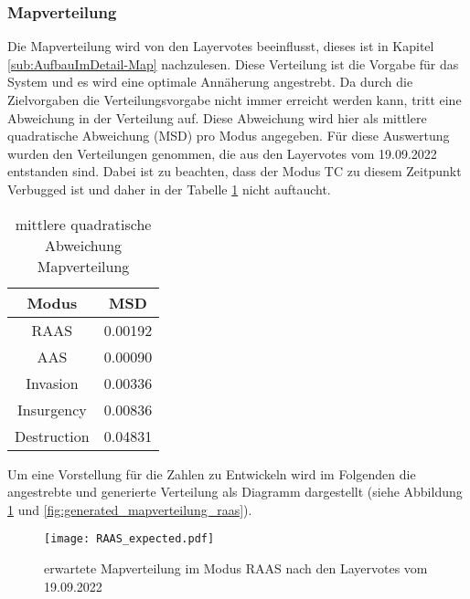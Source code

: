         \subsubsection{Mapverteilung}
            Die Mapverteilung wird von den Layervotes beeinflusst, dieses ist in Kapitel \ref{sub:AufbauImDetail-Map} nachzulesen.
            Diese Verteilung ist die Vorgabe für das System und es wird eine optimale Annäherung angestrebt. Da durch die 
            Zielvorgaben die Verteilungsvorgabe nicht immer erreicht werden kann, tritt eine Abweichung in der Verteilung auf.
            Diese Abweichung wird hier als mittlere quadratische Abweichung (MSD) pro Modus angegeben.
            Für diese Auswertung wurden den Verteilungen genommen, die aus den Layervotes vom 19.09.2022 entstanden sind.
            Dabei ist zu beachten, dass der Modus TC zu diesem Zeitpunkt \glqq{}Verbugged\grqq{} ist und daher 
            in der Tabelle \ref{t:Ergebnisse:fehler_Mapverteilung} nicht auftaucht.\\
            \begin{table}[h]
                \centering
                \begin{tabular}{|| c c ||}
                    \hline
                    Modus & MSD \\
                    \hline
                    \hline
                    RAAS & 0.00192 \\
                    \hline
                    AAS & 0.00090 \\
                    \hline
                    Invasion & 0.00336 \\
                    \hline
                    Insurgency & 0.00836 \\
                    \hline
                    Destruction & 0.04831 \\
                    \hline
                \end{tabular}
                \caption{mittlere quadratische Abweichung Mapverteilung}
                \label{t:Ergebnisse:fehler_Mapverteilung}
            \end{table}
            
            Um eine Vorstellung für die Zahlen zu Entwickeln wird im Folgenden die angestrebte und generierte Verteilung als 
            Diagramm dargestellt (siehe Abbildung \ref{fig:expected_mapverteilung_raas} 
            und \ref{fig:generated_mapverteilung_raas}).

            \begin{figure}[htbp]
                \centering
                \texttt{[image: RAAS\_expected.pdf]}
                \caption{erwartete Mapverteilung im Modus RAAS nach den Layervotes vom 19.09.2022}
                \label{fig:expected_mapverteilung_raas}
            \end{figure}

